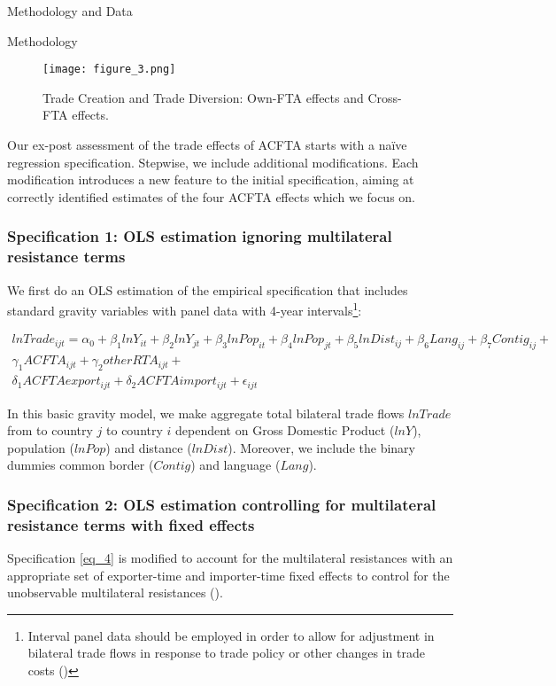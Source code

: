 \begin{section}{Methodology and Data }
\begin{subsection}{Methodology }
\begin{figure}[H]
	\centering
	\texttt{[image: figure\_3.png]}
	\caption{\small{Trade Creation and Trade Diversion: Own-FTA effects and Cross-FTA effects.}}
	\label{fig_3}
\end{figure}

Our ex-post assessment of the trade effects of ACFTA starts with a naïve regression specification. Stepwise, we include additional modifications. Each modification introduces a new feature to the initial specification, aiming at correctly identified estimates of the four ACFTA effects which we focus on.


\subsubsection*{Specification 1: OLS estimation ignoring multilateral resistance terms}

We first do an OLS estimation of the empirical specification that includes standard gravity variables with panel data with 4-year intervals\footnote{Interval panel data should be employed in order to allow for adjustment in bilateral trade flows in response to trade policy or other changes in trade costs (\cite{ypl_2016})}:

\begin{multline}\label{eq_4}
lnTrade_{ijt} = \alpha_0 + \beta_1 lnY_{it} + \beta_2 lnY_{jt} + \beta_3 lnPop_{it} + \beta_4 lnPop_{jt}  + \beta_5 lnDist_{ij} + \beta_6 Lang_{ij} + \beta_7 Contig_{ij} + \\
\gamma_1 ACFTA_{ijt} + \gamma_2 otherRTA_{ijt} + \\ 
\delta_1 ACFTAexport_{ijt} + \delta_2 ACFTAimport_{ijt} + \epsilon_{ijt}
\end{multline}

In this basic gravity model, we make aggregate total bilateral trade flows $lnTrade$ from to country $j$ to country $i$ dependent on Gross Domestic Product ($lnY$), population ($lnPop$) and distance ($lnDist$). Moreover, we include the binary dummies common border ($Contig$) and language ($Lang$). 


\subsubsection*{Specification 2: OLS estimation controlling for multilateral resistance terms with fixed effects}
Specification \ref{eq_4} is modified to account for the multilateral resistances with an appropriate set of exporter-time and importer-time fixed effects to control for the unobservable multilateral resistances (\cite{avw2003}).


\end{subsection}
\end{section}

